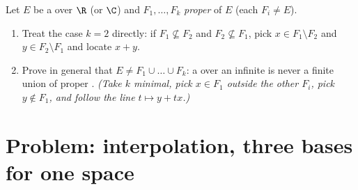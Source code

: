 \begin{exercise}[$\star\star\star$]\label{exo:b1:vspaces:12}
Let $E$ be a  over $\R$ (or $\C$) and $F_1, \dots,
F_k$ \emph{proper}  of $E$ (each $F_i \neq E$).
\begin{enumerate}
  \item Treat the case $k = 2$ directly: if $F_1 \not\subseteq
        F_2$ and $F_2 \not\subseteq F_1$, pick $x \in F_1
        \setminus F_2$ and $y \in F_2 \setminus F_1$ and locate $x
        + y$.
  \item Prove in general that $E \neq F_1 \cup \dots \cup F_k$: a
         over an infinite  is never a finite
        union of proper . \emph{(Take $k$ minimal, pick
        $x \in F_1$ outside the other $F_i$, pick $y \notin F_1$,
        and follow the line $t \mapsto y + tx$.)}
\end{enumerate}
\end{exercise}

\section{Problem: interpolation, three bases for one space}

